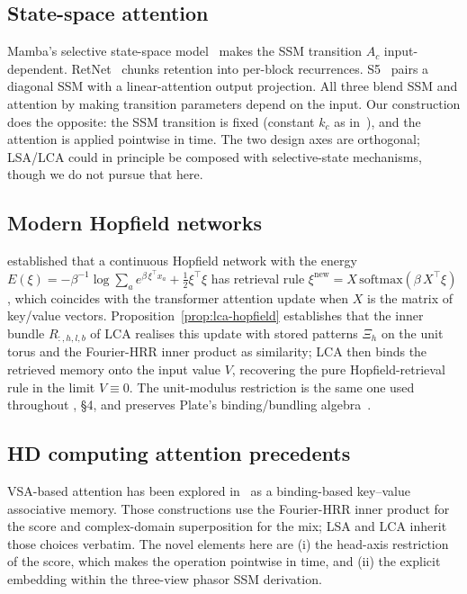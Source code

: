 \documentclass[11pt]{article}
\theoremstyle{definition}
\begin{document}
\subsection{State-space attention}

Mamba's selective state-space model~\cite{mamba} makes the SSM
transition $A_c$ input-dependent. RetNet~\cite{retnet} chunks
retention into per-block recurrences. S5~\cite{s5} pairs a diagonal
SSM with a linear-attention output projection. All three blend SSM and
attention by making transition parameters depend on the input. Our
construction does the opposite: the SSM transition is fixed (constant
$k_c$ as in~\cite{phasor-ssm-derivation}), and the attention is
applied pointwise in time. The two design axes are orthogonal; LSA/LCA
could in principle be composed with selective-state mechanisms,
though we do not pursue that here.

\subsection{Modern Hopfield networks}

\cite{hopfield-is-all-you-need} established that a continuous Hopfield
network with the energy
\(
  E(\xi) = -\beta^{-1}\log\sum_a e^{\beta\,\xi^\top x_a} + \tfrac{1}{2}\xi^\top\xi
\)
has retrieval rule
$\xi^{\mathrm{new}} = X\,\mathrm{softmax}(\beta\,X^\top\xi)$, which
coincides with the transformer attention update when $X$ is the matrix
of key/value vectors. Proposition~\ref{prop:lca-hopfield} establishes
that the inner bundle $R_{:,h,l,b}$ of LCA realises this update with
stored patterns $\Xi_h$ on the unit torus and the Fourier-HRR inner
product as similarity; LCA then binds the retrieved memory onto the
input value $V$, recovering the pure Hopfield-retrieval rule in the
limit $V \equiv 0$. The unit-modulus restriction is the same one used
throughout \cite{phasor-ssm-derivation}, \S4, and preserves Plate's
binding/bundling algebra~\cite{hrr}.

\subsection{HD computing attention precedents}

VSA-based attention has been explored
in~\cite{vsa-attention,hd-binding-attention} as a binding-based
key--value associative memory. Those constructions use the
Fourier-HRR inner product for the score and complex-domain superposition
for the mix; LSA and LCA inherit those choices verbatim. The novel
elements here are (i) the head-axis restriction of the score, which
makes the operation pointwise in time, and (ii) the explicit
embedding within the three-view phasor SSM derivation.
\end{document}
